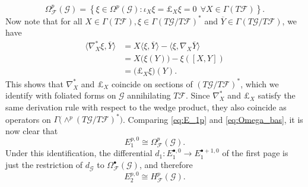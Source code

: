 \documentclass[11pt, letterpaper, oneside,reqno]{amsart}
\theoremstyle{plain}
\theoremstyle{underline}
\theoremstyle{definition}
\theoremstyle{remark}
\begin{document}
	\begin{equation}\label{eq:Omega_bas}
		\Omega^{p}_{\mathcal{F}}(\mathcal{G})=\left\{\xi\in\Omega^{p}(\mathcal{G}):\iota_X\xi=\pounds_X \xi=0\ \ \forall X\in\Gamma(T\mathcal{F})\right\}.
	\end{equation}
	Now note that for all $X\in\Gamma(T\mathcal{F}),\xi\in\Gamma(T\mathcal{G}/T\mathcal{F})^{*}$ and $\overline{Y}\in\Gamma(T\mathcal{G}/T\mathcal{F})$, we have
	\begin{align*}
		\langle \nabla_{X}^{*}\xi,\overline{Y}\rangle&=X\langle \xi,\overline{Y}\rangle-\langle\xi,\nabla_{X}\overline{Y}\rangle\\
		&=X\big(\xi(Y)\big)-\xi([X,Y])\\
		&=\big(\pounds_{X}\xi\big)(Y).
	\end{align*}
	This shows that $\nabla_{X}^{*}$ and $\pounds_X$ coincide on sections of 
	$(T\mathcal{G}/T\mathcal{F})^{*}$, which we identify with foliated forms on $\mathcal{G}$ annihilating $T\mathcal{F}$. Since $\nabla_{X}^{*}$ and $\pounds_X$ satisfy the same derivation rule with respect to the wedge product, they also coincide as operators on $\Gamma\big(\wedge^{p}(T\mathcal{G}/T\mathcal{F})^{*}\big)$. Comparing \eqref{eq:E_1p} and \eqref{eq:Omega_bas}, it is now clear that
	\[
	E_1^{p,0}\cong\Omega^{p}_{\mathcal{F}}(\mathcal{G}).
	\]
	Under this identification, the differential $d_1:E_1^{\bullet,0}\rightarrow E_1^{\bullet+1,0}$ of the first page is just the restriction of $d_{\mathcal{G}}$ to $\Omega^{\bullet}_{\mathcal{F}}(\mathcal{G})$, and therefore
	\begin{equation}\label{eq:bas-coho}
		E_2^{p,0}\cong H^{p}_{\mathcal{F}}(\mathcal{G}).
	\end{equation}
	
\end{document}
